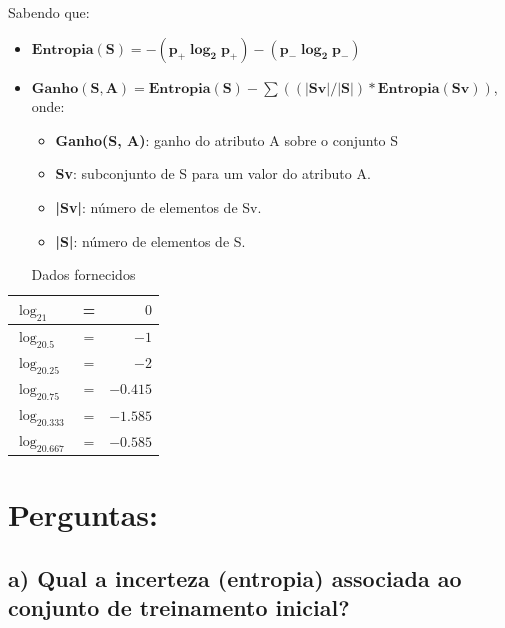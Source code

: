 \documentclass[
    article,            %
    11pt,               %
    oneside,            %
    a4paper,            %
    english,            %
    brazil,             %
    sumario=tradicional,
    ]{abntex2}
\begin{document}
Sabendo que:
\begin{itemize}
    \item$\boldsymbol{Entropia(S) = - (p_+ \log_2 p_+) - (p_- \log_2 p_-)}$
    \item$\boldsymbol{Ganho(S, A) = Entropia(S) - \sum ((|Sv| / |S|) * Entropia (Sv))}$, onde:
    \begin{itemize}
        \item\textbf{Ganho(S, A)}: ganho do atributo A sobre o conjunto S
        \item\textbf{Sv}: subconjunto de S para um valor do atributo A.
        \item\textbf{|Sv|}: número de elementos de Sv.
        \item\textbf{|S|}: número de elementos de S.
    \end{itemize}
\end{itemize}

\begin{table}[H]
\centering
\caption{Dados fornecidos}
\label{logs_table}
\begin{tabular}{|l c r|}
\hline
\rowcolor[HTML]{34CDF9} 
$\log_21$     & = & $0$      \\ \hline
$\log_20.5$   & = & $-1$     \\ \hline
\rowcolor[HTML]{34CDF9} 
$\log_20.25$  & = & $-2$     \\ \hline
$\log_20.75$  & = & $-0.415$ \\ \hline
\rowcolor[HTML]{34CDF9} 
$\log_20.333$ & = & $-1.585$ \\ \hline
$\log_20.667$ & = & $-0.585$ \\ \hline
\end{tabular}
\end{table}


\section*{\textbf{Perguntas:}}
\subsection*{\textbf{a) Qual a incerteza (entropia) associada ao conjunto de treinamento inicial?}}
\end{document}
